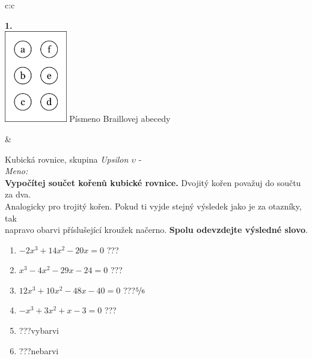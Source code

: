 \documentclass[10pt]{report}
\begin{document}
\begin{tabular}{c:c}
\begin{minipage}[c][99mm][t]{0.49\linewidth}
\begin{center}
\begin{minipage}{0.20\linewidth}
\begin{center}
{\Huge\bfseries 1.} \\[2mm]
\includegraphics[height=40mm]{../images/braille.png}
{\small Písmeno Braillovej abecedy}
\end{center}
\end{minipage}
\end{center}
\end{minipage}
&
\begin{minipage}[c][99mm][t]{0.49\linewidth}
\begin{center}
\vspace{7mm}
{\huge Kubická rovnice, skupina \textit{Upsilon $\upsilon$} -}\\[4.5mm]
\textit{Meno:}\phantom{xxxxxxxxxxxxxxxxxxxxxxxxxxxxxxxxxxxxxxxxxxxxxxxxxxxxxxxxxxxxxxxxx}\\[3.5mm]
\textbf{Vypočítej součet kořenů kubické rovnice.} Dvojitý kořen považuj do součtu za dva.\\Analogicky pro trojitý kořen. Pokud ti vyjde stejný výsledek jako je za otazníky, tak\\napravo obarvi příslušející kroužek načerno. \textbf{Spolu odevzdejte výsledné slovo}.\\[3mm]
\begin{minipage}{0.77\linewidth}
\begin{center}
\begin{varwidth}{\textwidth}
\begin{enumerate}
\large
\item $-2x^3+14x^2-20x=0$\quad \dotfill\; ???\;\dotfill {}
\item $x^3-4x^2-29x-24=0$\quad \dotfill\; ???\;\dotfill {}
\item $12x^3+10x^2-48x-40=0$\quad \dotfill\; ???\;\dotfill \quad $\nicefrac{5}{6}$
\item $-x^3+3x^2+x-3=0$\quad \dotfill\; ???\;\dotfill {}
\item \quad \dotfill\; ???\;\dotfill \quad vybarvi
\item \quad \dotfill\; ???\;\dotfill \quad nebarvi
\end{enumerate}

\end{varwidth}
\end{center}
\end{minipage}
\end{center}
\end{minipage}
\end{tabular}
\end{document}
